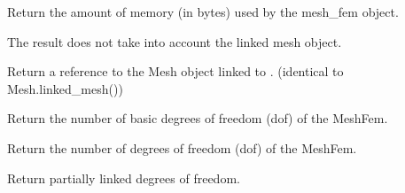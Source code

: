 \documentclass[a4paper,11pt,english]{sphinxmanual}
\begin{document}
\begin{fulllineitems}
\begin{fulllineitems}
\label{\detokenize{python/cmdref_MeshFem:getfem.MeshFem.memsize}}
Return the amount of memory (in bytes) used by the mesh\_fem object.

The result does not take into account the linked mesh object.

\end{fulllineitems}


\begin{fulllineitems}
\label{\detokenize{python/cmdref_MeshFem:getfem.MeshFem.mesh}}
Return a reference to the Mesh object linked to .
(identical to Mesh.linked\_mesh())

\end{fulllineitems}


\begin{fulllineitems}
\label{\detokenize{python/cmdref_MeshFem:getfem.MeshFem.nb_basic_dof}}
Return the number of basic degrees of freedom (dof) of the MeshFem.

\end{fulllineitems}


\begin{fulllineitems}
\label{\detokenize{python/cmdref_MeshFem:getfem.MeshFem.nbdof}}
Return the number of degrees of freedom (dof) of the MeshFem.

\end{fulllineitems}


\begin{fulllineitems}
\label{\detokenize{python/cmdref_MeshFem:getfem.MeshFem.non_conformal_basic_dof}}
Return partially linked degrees of freedom.


\end{fulllineitems}
\end{fulllineitems}
\end{document}
